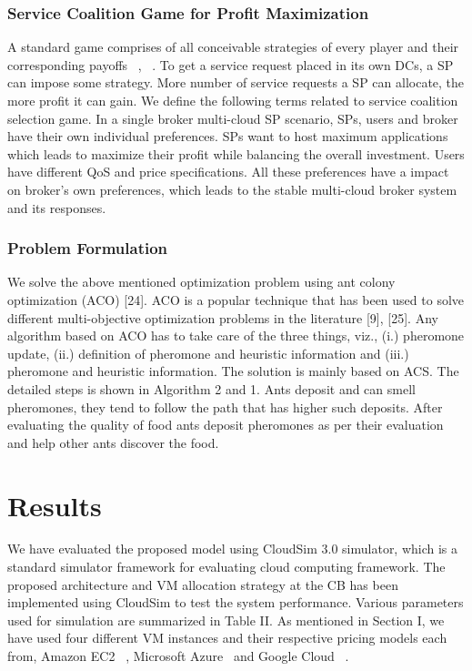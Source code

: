 \documentclass[12pt,a4paper,twoside,openright]{report}
\newcommand\tab[1][0.8cm]{\hspace*{#1}}
\begin{document}
\subsection{Service Coalition Game for Profit Maximization}\label{AA}
A standard game comprises of all conceivable strategies of
every player and their corresponding payoffs ~\cite{b10}, ~\cite{b8}. To get
a service request placed in its own DCs, a SP can impose some
strategy. More number of service requests a SP can allocate,
the more profit it can gain. We define the following terms
related to service coalition selection game.
\newline
\tab In a single broker multi-cloud SP scenario, SPs, users and
broker have their own individual preferences. SPs want to
host maximum applications which leads to maximize their
profit while balancing the overall investment. Users have
different QoS and price specifications. All these preferences
have a impact on broker’s own preferences, which leads to
the stable multi-cloud broker system and its responses.

\subsection{Problem Formulation}
We solve the above mentioned optimization problem using ant colony optimization (ACO) [24]. ACO is a popular
technique that has been used to solve different multi-objective
optimization problems in the literature [9], [25]. Any algorithm
based on ACO has to take care of the three things, viz., (i.)
pheromone update, (ii.) definition of pheromone and heuristic
information and (iii.) pheromone and heuristic information.
The solution is mainly based on ACS. The detailed steps is
shown in Algorithm 2 and 1. Ants deposit and can smell
pheromones, they tend to follow the path that has higher
such deposits. After evaluating the quality of food ants deposit pheromones as per their evaluation and help other ants
discover the food.
\chapter{Results}\label{ch:ch4}
We have evaluated the proposed model using CloudSim
3.0 simulator, which is a standard simulator framework for
evaluating cloud computing framework. The proposed architecture and VM allocation strategy at the CB has been
implemented using CloudSim to test the system performance.
Various parameters used for simulation are summarized in
Table II. As mentioned in Section I, we have used four different VM instances and their respective pricing models
each from, Amazon EC2 ~\cite{b5}, Microsoft Azure ~\cite{b6}and Google
Cloud ~\cite{b7}.
\end{document}
